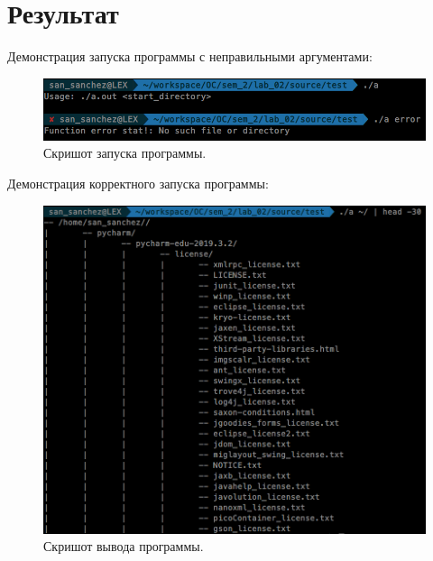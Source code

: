 \newpage

\section{Результат}

Демонстрация запуска программы с неправильными аргументами:
\begin{figure}[H]
    \centering
    \includegraphics[scale=0.5]{data/image/error.png}
    \caption{Скришот запуска программы.}
\end{figure}

Демонстрация корректного запуска программы:
\begin{figure}[H]
    \centering
    \includegraphics[scale=0.5]{data/image/work_1.png}
    \caption{Скришот вывода программы.}
\end{figure}

